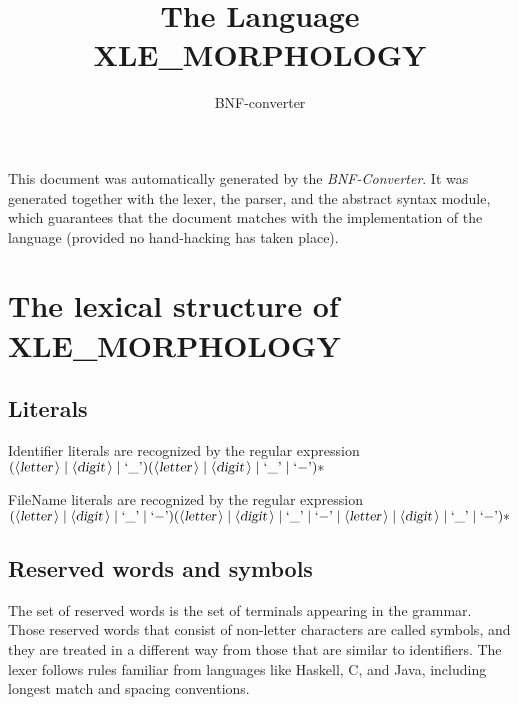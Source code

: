 \documentclass[a4paper,11pt]{article}
\author{BNF-converter}
\title{The Language XLE_MORPHOLOGY}
\begin{document}
\maketitle

\newcommand{\emptyP}{\mbox{$\epsilon$}}
\newcommand{\terminal}[1]{\mbox{{\texttt {#1}}}}
\newcommand{\nonterminal}[1]{\mbox{$\langle \mbox{{\sl #1 }} \! \rangle$}}
\newcommand{\arrow}{\mbox{::=}}
\newcommand{\delimit}{\mbox{$|$}}
\newcommand{\reserved}[1]{\mbox{{\texttt {#1}}}}
\newcommand{\literal}[1]{\mbox{{\texttt {#1}}}}
\newcommand{\symb}[1]{\mbox{{\texttt {#1}}}}

This document was automatically generated by the {\em BNF-Converter}. It was generated together with the lexer, the parser, and the abstract syntax module, which guarantees that the document matches with the implementation of the language (provided no hand-hacking has taken place).

\section*{The lexical structure of XLE_MORPHOLOGY}

\subsection*{Literals}



Identifier literals are recognized by the regular expression
\(({\nonterminal{letter}} \mid {\nonterminal{digit}} \mid \mbox{`\_'}) ({\nonterminal{letter}} \mid {\nonterminal{digit}} \mid \mbox{`\_'} \mid \mbox{`{$-$}'})*\)

FileName literals are recognized by the regular expression
\(({\nonterminal{letter}} \mid {\nonterminal{digit}} \mid \mbox{`\_'} \mid \mbox{`{$-$}'}) ({\nonterminal{letter}} \mid {\nonterminal{digit}} \mid \mbox{`\_'} \mid \mbox{`{$-$}'} \mid {\nonterminal{letter}} \mid {\nonterminal{digit}} \mid \mbox{`\_'} \mid \mbox{`{$-$}'})*\)


\subsection*{Reserved words and symbols}
The set of reserved words is the set of terminals appearing in the grammar. Those reserved words that consist of non-letter characters are called symbols, and they are treated in a different way from those that are similar to identifiers. The lexer follows rules familiar from languages like Haskell, C, and Java, including longest match and spacing conventions.
\end{document}
